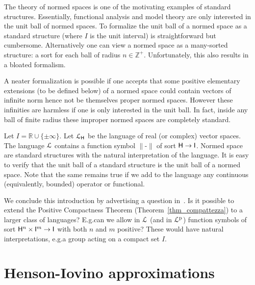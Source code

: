 \documentclass[10pt,oneside]{amsproc}
\begin{document}
The theory of normed spaces is one of the motivating examples of standard structures.
Essentially, functional analysis and model theory are only interested in the unit ball of normed spaces.
To formalize the unit ball of a normed space as a standard structure (where $I$ is the unit interval) is straightforward but cumbersome.
Alternatively one can view a normed space as a many-sorted structure: a sort for each ball of radius $n\in\mathds{Z}^+$.
Unfortunately, this also results in a bloated formalism.

A neater formalization is possible if one accepts that some positive elementary extensions (to be defined below) of a normed space could contain vectors of infinite norm hence not be themselves proper normed spaces.
However these infinities are harmless if one is only interested in the unit ball.
In fact, inside any ball of finite radius these improper normed spaces are completely standard.

\begin{example}\label{ex_normed_spaces}
Let $I=\mathds{R}\cup\{\pm\infty\}$.
Let ${\EuScript L}_{\sf H}$ be the language of real (or complex) vector spaces.
The language ${\EuScript L}$ contains a function symbol $\|\mbox{-}\|$ of sort ${\sf H}\to {\sf I}$.
Normed space are standard structures with the natural interpretation of the language.
It is easy to verify that the unit ball of a standard structure is the unit ball of a normed space.
Note that the same remains true if we add to the language any continuous (equivalently, bounded) operator or functional.
\end{example}

We conclude this introduction by advertising a question in~\cite{clcl}.
Is it possible to extend the Positive Compactness Theorem (Theorem~\ref{thm_compattezza}) to a larger class of languages?
E.g.\@ can we allow in ${\EuScript L}$ (and in ${\EuScript L}^{\rm p}$) function symbols of sort ${\sf H}^n\times {\sf I}^m\to {\sf I}$ with both $n$ and $m$ positive?
These would have natural interpretations, e.g.\@ a group acting on a compact set $I$.

\section{Henson-Iovino approximations}\label{ultrapws}
\end{document}
